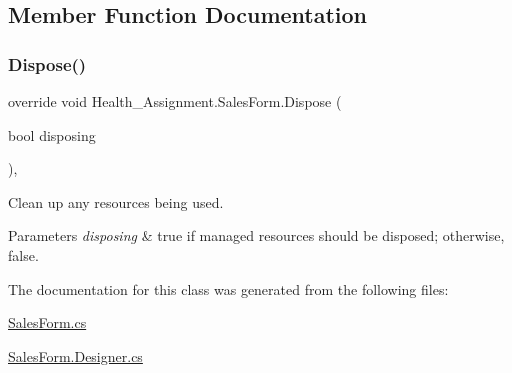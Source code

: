 \subsection{Member Function Documentation}
\mbox{\label{class_health___assignment_1_1_sales_form_a7adf571b90732126b756e48eeb360586}} 
\subsubsection{\texorpdfstring{Dispose()}{Dispose()}}
{\footnotesize\ttfamily override void Health\+\_\+\+Assignment.\+Sales\+Form.\+Dispose (\begin{DoxyParamCaption}\item[{bool}]{disposing }\end{DoxyParamCaption})\hspace{0.3cm}{\ttfamily [inline]}, {\ttfamily [protected]}}



Clean up any resources being used. 


\begin{DoxyParams}{Parameters}
{\em disposing} & true if managed resources should be disposed; otherwise, false.\\
\hline
\end{DoxyParams}


The documentation for this class was generated from the following files\+:\begin{DoxyCompactItemize}
\item 
\hyperlink{_sales_form_8cs}{Sales\+Form.\+cs}\item 
\hyperlink{_sales_form_8_designer_8cs}{Sales\+Form.\+Designer.\+cs}\end{DoxyCompactItemize}
